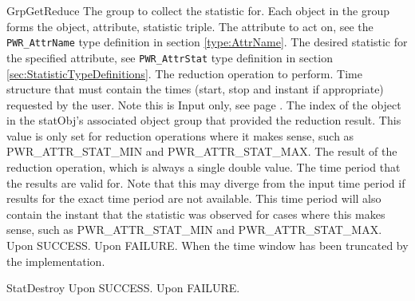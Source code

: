 \begin{prototype}{GrpGetReduce}
			{\pInput}{The group to collect the statistic for. Each object in the group forms the object, attribute, statistic triple.}
			{\pInput}{The attribute to act on, see the \texttt{PWR_AttrName} type definition in section \ref{type:AttrName}.}
		{\pInput}{The desired statistic for the specified attribute, see \texttt{PWR_AttrStat} type definition in section \ref{sec:StatisticTypeDefinitions}.}
		{\pInput}{The reduction operation to perform.}
		{\pInput}{Time structure that must contain the times (start, stop and instant if appropriate) requested by the user. Note this is Input only, see page \pageref{type:TimePeriod}.}
				{\pOutput}{The index of the object in the statObj's associated object group that provided the reduction result. This value is only set for reduction operations where it makes sense, such as PWR_ATTR_STAT_MIN and PWR_ATTR_STAT_MAX.}
			{\pOutput}{The result of the reduction operation, which is always a single double value.}
		{\pOutput}{The time period that the results are valid for. Note that this may diverge from the input time period if results for the exact time period are not available. This time period will also contain the instant that the statistic was observed for cases where this makes sense, such as PWR_ATTR_STAT_MIN and PWR_ATTR_STAT_MAX.}
	 	{Upon SUCCESS.}
	 	{Upon FAILURE.}
	 	{When the time window has been truncated by the implementation.} 
\end{prototype}

\begin{prototype}{StatDestroy}
	 {Upon SUCCESS.}
	 {Upon FAILURE.}
\end{prototype}
